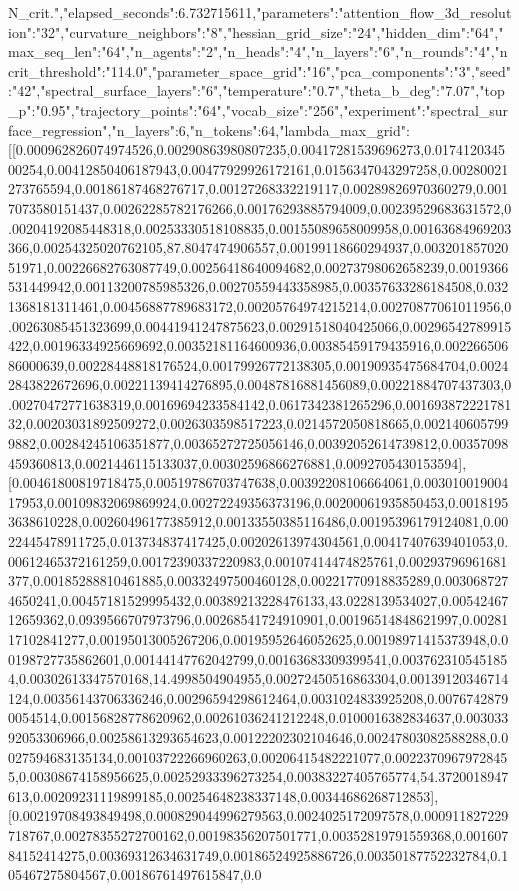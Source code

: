 \documentclass{article}
\begin{document}
N_crit.","elapsed_seconds":6.732715611,"parameters":{"attention_flow_3d_resolution":"32","curvature_neighbors":"8","hessian_grid_size":"24","hidden_dim":"64","max_seq_len":"64","n_agents":"2","n_heads":"4","n_layers":"6","n_rounds":"4","ncrit_threshold":"114.0","parameter_space_grid":"16","pca_components":"3","seed":"42","spectral_surface_layers":"6","temperature":"0.7","theta_b_deg":"7.07","top_p":"0.95","trajectory_points":"64","vocab_size":"256"},"experiment":"spectral_surface_regression","n_layers":6,"n_tokens":64,"lambda_max_grid":[[0.000962826074974526,0.00290863980807235,0.00417281539696273,0.017412034500254,0.00412850406187943,0.00477929926172161,0.0156347043297258,0.00280021273765594,0.00186187468276717,0.00127268332219117,0.00289826970360279,0.0017073580151437,0.00262285782176266,0.00176293885794009,0.00239529683631572,0.00204192085448318,0.00253330518108835,0.00155089658009958,0.00163684969203366,0.00254325020762105,87.8047474906557,0.00199118660294937,0.00320185702051971,0.00226682763087749,0.00256418640094682,0.00273798062658239,0.0019366531449942,0.00113200785985326,0.00270559443358985,0.00357633286184508,0.0321368181311461,0.00456887789683172,0.00205764974215214,0.00270877061011956,0.00263085451323699,0.00441941247875623,0.00291518040425066,0.00296542789915422,0.00196334925669692,0.00352181164600936,0.00385459179435916,0.00226650686000639,0.00228448818176524,0.00179926772138305,0.00190935475684704,0.00242843822672696,0.00221139414276895,0.00487816881456089,0.00221884707437303,0.00270472771638319,0.00169694233584142,0.0617342381265296,0.00169387222178132,0.00203031892509272,0.0026303598517223,0.0214572050818665,0.0021406057999882,0.00284245106351877,0.00365272725056146,0.00392052614739812,0.00357098459360813,0.0021446115133037,0.00302596866276881,0.0092705430153594],[0.00461800819718475,0.00519786703747638,0.00392208106664061,0.00301001900417953,0.00109832069869924,0.00272249356373196,0.00200061935850453,0.00181953638610228,0.00260496177385912,0.00133550385116486,0.00195396179124081,0.0022445478911725,0.013734837417425,0.00202613974304561,0.00417407639401053,0.00612465372161259,0.00172390337220983,0.00107414474825761,0.00293796961681377,0.00185288810461885,0.00332497500460128,0.00221770918835289,0.0030687274650241,0.00457181529995432,0.00389213228476133,43.0228139534027,0.0054246712659362,0.0939566707973796,0.00268541724910901,0.00196514848621997,0.0028117102841277,0.00195013005267206,0.00195952646052625,0.00198971415373948,0.00198727735862601,0.00144147762042799,0.00163683309399541,0.0037623105451854,0.00302613347570168,14.4998504904955,0.00272450516863304,0.00139120346714124,0.00356143706336246,0.00296594298612464,0.0031024833925208,0.00767428790054514,0.00156828778620962,0.00261036241212248,0.0100016382834637,0.00303392053306966,0.00258613293654623,0.00122202302104646,0.00247803082588288,0.0027594683135134,0.00103722266960263,0.00206415482221077,0.00223709679728455,0.00308674158956625,0.00252933396273254,0.00383227405765774,54.3720018947613,0.00209231119899185,0.00254648238337148,0.00344686268712853],[0.00219708493849498,0.000829044996279563,0.0024025172097578,0.000911827229718767,0.00278355272700162,0.00198356207501771,0.00352819791559368,0.00160784152414275,0.00369312634631749,0.00186524925886726,0.00350187752232784,0.105467275804567,0.00186761497615847,0.0
\end{document}
